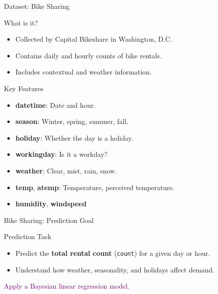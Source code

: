 \documentclass{beamer}
\begin{document}
\begin{frame}{Dataset: Bike Sharing}
  \begin{block}{What is it?}
    \begin{itemize}
      \item Collected by Capital Bikeshare in Washington, D.C.
      \item Contains daily and hourly counts of bike rentals.
      \item Includes contextual and weather information.
    \end{itemize}
  \end{block}
  \begin{block}{Key Features}
    \begin{itemize}
      \item \textbf{datetime}: Date and hour.
      \item \textbf{season}: Winter, spring, summer, fall.
      \item \textbf{holiday}: Whether the day is a holiday.
      \item \textbf{workingday}: Is it a workday?
      \item \textbf{weather}: Clear, mist, rain, snow.
      \item \textbf{temp}, \textbf{atemp}: Temperature, perceived temperature.
      \item \textbf{humidity}, \textbf{windspeed}
    \end{itemize}
  \end{block}
\end{frame}

\begin{frame}{Bike Sharing: Prediction Goal}
  \begin{block}{Prediction Task}
    \begin{itemize}
      \item Predict the \textbf{total rental count} (\texttt{count}) for a given day or hour.
      \item Understand how weather, seasonality, and holidays affect demand.
    \end{itemize}
  \end{block}
  \vfill
  \centering
  \textcolor{purple}{\large Apply a Bayesian linear regression model.}
\end{frame}
\end{document}
